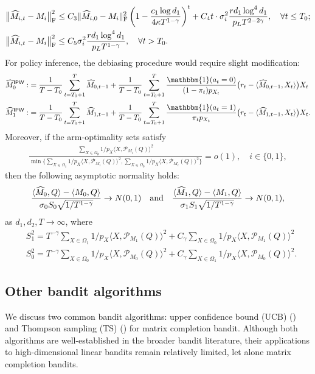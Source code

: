\documentclass[12pt]{article}
\newcommand\fro[1]{\| #1 \|_{\rm{F}}}
\newcommand{\inp}[2]{\langle #1,#2\rangle}
\def\calP{{\mathcal P}}
\def\hat{\widehat}
\def\uipw{\textsf{IPW}}
\theoremstyle{plain}
\begin{document}
\begin{align*}
    &\big\|\hat M_{i, t} - M_i \big\|_{\rm F}^2\leq C_3\fro{\widehat{M}_{i,0}-M_i}^2 \left(1-\frac{c_1\log d_1}{4\kappa T^{1-\gamma}}\right)^t + C_4t\cdot \sigma_i^2\frac{rd_1\log^4 d_1}{p_LT^{2-2\gamma}}, \quad\forall t\leq T_0; \\
    &\big\|\hat M_{i, t} - M_i \big\|_{\rm F}^2\leq C_5\sigma_i^2\frac{rd_1\log^4 d_1}{p_LT^{1-\gamma}}, \quad \forall t>T_0.
\end{align*}
For policy inference, the debiasing procedure would require slight modification:
\begin{align*}
    \hat M_0^{\uipw}:&= \frac{1}{T-T_0}\sum_{t=T_0+1}^T \hat M_{0, t-1}+\frac{1}{T-T_0}\sum_{t=T_0+1}^T \frac{\mathbbm{1}(a_t=0)}{(1-\pi_t)p_{X_t}} \big(r_t-\langle \hat M_{0, t-1}, X_t\rangle\big)X_t \\
    \hat M_1^{\uipw}:&= \frac{1}{T-T_0}\sum_{t=T_0+1}^T \hat M_{1, t-1}+\frac{1}{T-T_0}\sum_{t=T_0+1}^T \frac{\mathbbm{1}(a_t=1)}{\pi_tp_{X_t}} \big(r_t-\langle \hat M_{1, t-1}, X_t\rangle\big)X_t.  
\end{align*}
Moreover, if the arm-optimality sets satisfy 
\begin{align*}
    \frac{\sum_{X\in \Omega_{\emptyset}}1/p_{X}\inp{X}{\calP_{M_i}(Q)}^2}{\min\{\sum_{X\in \Omega_1}1/p_{X}\inp{X}{\calP_{M_i}(Q)}^2, \sum_{X\in \Omega_0}1/p_{X}\inp{X}{\calP_{M_i}(Q)}^2\}}=o(1), \quad i\in\{0,1\}, 
\end{align*}
then the following asymptotic normality holds:
\begin{align*}
 \frac{\langle \hat M_0, Q\rangle - \langle M_0, Q\rangle}{\sigma_0S_0 \sqrt{1/T^{1-\gamma}}}\rightarrow N(0,1)\quad {\rm and}\quad 
 \frac{\langle \hat M_1, Q\rangle - \langle M_1, Q\rangle}{\sigma_1S_1 \sqrt{1/T^{1-\gamma}}}\rightarrow N(0,1),
\end{align*}
as $d_1,d_2, T\to\infty$,  where
\begin{align*}
 &S_1^2=T^{-\gamma}\sum_{X\in \Omega_1}1/p_{X}\inp{X}{\calP_{M_1}(Q)}^2+C_{\gamma}\sum_{X\in \Omega_0}1/p_{X}\inp{X}{\calP_{M_1}(Q)}^2 \\
&S_0^2=T^{-\gamma}\sum_{X\in \Omega_0}1/p_{X}\inp{X}{\calP_{M_0}(Q)}^2+C_{\gamma}\sum_{X\in \Omega_1}1/p_{X}\inp{X}{\calP_{M_0}(Q)}^2.
\end{align*}

\subsection{Other bandit algorithms}
We discuss two common bandit algorithms: upper confidence bound (UCB) (\cite{li2010contextual}) and Thompson sampling (TS) (\cite{agrawal2013thompson}) for matrix completion bandit. 
Although both algorithms are well-established in the broader bandit literature, their applications to high-dimensional linear bandits remain relatively limited, let alone matrix completion bandits.
\end{document}
